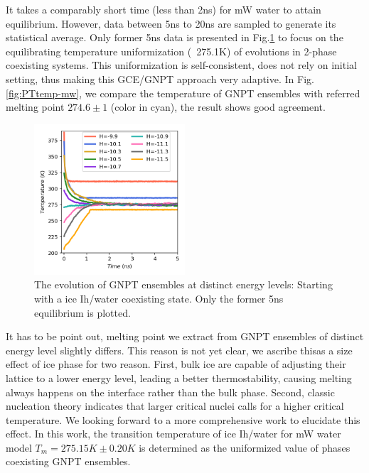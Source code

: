 \documentclass[aps,prl,twocolumn,superscriptaddress]{revtex4-1}
\begin{document}
It takes a comparably short time (less than 2ns) for mW water to attain equilibrium. However, data between 5ns to 20ns are  sampled to generate its statistical average. Only former 5ns data is presented in Fig.\ref{fig:evolution} to focus on the equilibrating temperature uniformization (~275.1K) of evolutions in 2-phase coexisting systems. This uniformization is self-consistent, does not rely on initial setting, thus making this GCE/GNPT approach very adaptive. In Fig. \ref{fig:PTtemp-mw}, we compare the temperature of GNPT ensembles with referred melting point $274.6\pm 1$  \cite{Molinero2009} (color in cyan), the result shows good agreement. 
\begin{figure}[ht]
\centering{}\includegraphics[width=0.5\textwidth]{PoteScan.png} 
\caption{The evolution of GNPT ensembles at distinct energy levels: Starting with a ice Ih/water coexisting state. Only the former 5ns equilibrium is plotted.
\label{fig:evolution} }
\end{figure}
It has to be point out, melting point we extract from GNPT ensembles of distinct energy level slightly differs. This reason is not yet clear, we ascribe thisas a size effect of ice phase for two reason. First, bulk ice are capable of adjusting their lattice to a lower energy level, leading a better thermostability, causing melting always happens on the interface rather than the bulk phase. Second, classic nucleation theory indicates that larger critical nuclei calls for a higher critical temperature.  We looking forward to a more comprehensive work to elucidate this effect. In this work, the transition temperature of ice Ih/water for mW water model $T_m=275.15K\pm 0.20K$ is determined as the uniformized value of phases coexisting GNPT ensembles. 
\end{document}
